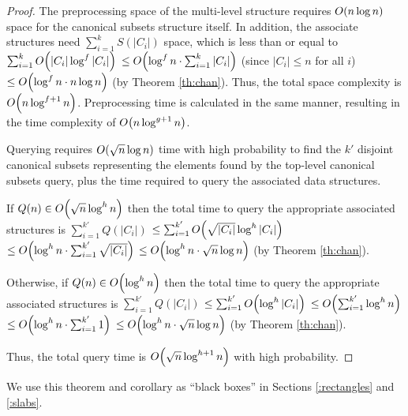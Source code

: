\begin{proof}
The preprocessing space of the multi-level structure requires $O\!\left(n 
\log{n}\right)$ space for the canonical subsets structure itself. In addition, the 
associate structures need 
$\sum_{i=1}^k{S(|C_i|)}$ space, which is less than or equal to 
$\sum_{i=1}^k{O\!\left(|C_i| \log^f{|C_i|}\right)}$ 
$\leq O\!\left(\log^f{n} \cdot \sum_{i=1}^k{|C_i|}\right)$ (since $|C_i| \leq n$ for all 
$i$)  
$\leq O\!\left(\log^f{n} \cdot n \log{n}\right)$  (by Theorem \ref{th:chan}). 
Thus, the total space complexity is $O\!\left(n\log^{f+1}{n}\right)$.
Preprocessing time is calculated in the same manner, resulting in the time 
complexity  of $O\!\left(n\log^{g+1}{n}\right)$.

Querying requires $O\!\left(\sqrt{n}\log{n}\right)$ time with high probability  to find 
the $k'$ disjoint canonical 
subsets representing the elements found by the top-level canonical subsets 
query, plus the time required to 
query the associated data structures.  

If $Q(n) \in O\!\left(\sqrt{n}\log^h{n}\right)$ then the total time to query the 
appropriate associated structures is
$\sum_{i=1}^{k'}{Q(|C_i|)}$
$\leq \sum_{i=1}^{k'}{O\!\left(\sqrt{|C_i|}\log^h{|C_i|}\right)}$
$\leq O\!\left(\log^h{n} \cdot \sum_{i=1}^{k'}{\sqrt{|C_i|}}\right)$
$\leq O\!\left(\log^h{n} \cdot \sqrt{n}\log{n}\right)$ (by Theorem \ref{th:chan}).

Otherwise, if $Q(n) \in O\!\left(\log^h{n}\right)$ then the total time to query the 
appropriate associated structures is
$\sum_{i=1}^{k'}{Q(|C_i|)}$
$\leq \sum_{i=1}^{k'}{O\!\left(\log^h{|C_i|}\right)}$
$\leq O\!\left(\sum_{i=1}^{k'}{\log^h{n}}\right)$
$\leq O\!\left(\log^h{n} \cdot \sum_{i=1}^{k'}{1}\right)$
$\leq O\!\left(\log^h{n} \cdot \sqrt{n}\log{n}\right)$ (by Theorem \ref{th:chan}).

Thus, the total query time  is $O\!\left(\sqrt{n}\log^{h+1}{n}\right)$ with high 
probability.
\end{proof}

We use this theorem and corollary as ``black boxes'' in Sections 
\ref{:rectangles} and \ref{:slabs}.